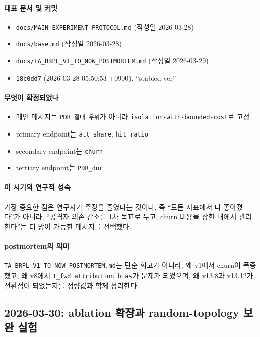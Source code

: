 \documentclass[12pt,a4paper]{article}
\begin{document}
\paragraph{대표 문서 및 커밋}
\begin{itemize}[leftmargin=1.5em]
\item \texttt{docs/MAIN\_EXPERIMENT\_PROTOCOL.md} (작성일 2026-03-28)
\item \texttt{docs/base.md} (작성일 2026-03-28)
\item \texttt{docs/TA\_BRPL\_V1\_TO\_NOW\_POSTMORTEM.md} (작성일 2026-03-29)
\item \texttt{18c0dd7} (2026-03-28 05:50:53 +0900), ``stabled ver''
\end{itemize}

\paragraph{무엇이 확정되었나}
\begin{itemize}[leftmargin=1.5em]
\item 메인 메시지는 \texttt{PDR 절대 우위}가 아니라
\texttt{isolation-with-bounded-cost}로 고정
\item primary endpoint는 \texttt{att\_share}, \texttt{hit\_ratio}
\item secondary endpoint는 \texttt{churn}
\item tertiary endpoint는 \texttt{PDR\_dur}
\end{itemize}

\paragraph{이 시기의 연구적 성숙}
가장 중요한 점은 연구자가 주장을 줄였다는 것이다.
즉 ``모든 지표에서 다 좋아졌다''가 아니라,
``공격자 의존 감소를 1차 목표로 두고, churn 비용을 상한 내에서 관리한다''는 더
방어 가능한 메시지를 선택했다.

\paragraph{postmortem의 의미}
\texttt{TA\_BRPL\_V1\_TO\_NOW\_POSTMORTEM.md}는 단순 회고가 아니라,
왜 v1에서 churn이 폭증했고, 왜 v8에서 \texttt{T\_fwd attribution bias}가
문제가 되었으며, 왜 v13.8과 v13.12가 전환점이 되었는지를 정량값과 함께 정리한다.

\subsection{2026-03-30: ablation 확장과 random-topology 보완 실험}
\end{document}
